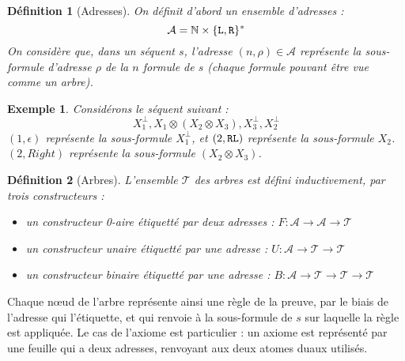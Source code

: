 \documentclass[11pt,a4paper]{article}
\newtheorem{example}{Exemple}
\newtheorem{definition}{Définition}
\newcommand*{\orth}{^\perp}
\newcommand*{\tensor}{\otimes}
\newcommand*{\Left}{\textnormal{\texttt{L}}}
\newcommand*{\Right}{\textnormal{\texttt{R}}}
\newcommand*{\trees}{\ensuremath{\mathcal{T}}}
\begin{document}
\begin{definition}[Adresses]
On définit d'abord un ensemble d'adresses :
\begin{equation*}
\mathcal{A} = \mathbb{N} \times \{ \Left, \Right\}^{*}  
\end{equation*}
On considère que, dans un séquent $s$, l'adresse $(n, \rho) \in \mathcal{A}$ représente la sous-formule d'adresse $\rho$ de la $n$\ieme{} formule de $s$ (chaque formule pouvant être vue comme un arbre).
\end{definition}

\begin{example}
Considérons le séquent suivant : 
\begin{equation*}
X_1\orth, X_1 \tensor (X_2 \tensor X_3), X_3\orth, X_2\orth
\end{equation*}
$(1, \epsilon)$ représente la sous-formule $X_1\orth$, et $(2, \Right \Left)$ représente la sous-formule $X_2$. $(2, Right)$ représente la sous-formule $(X_2 \tensor X_3)$.
\end{example}

\begin{definition}[Arbres]
L'ensemble \trees{} des arbres est défini inductivement, par trois constructeurs :
\begin{itemize}
  \item un constructeur 0-aire étiquetté par deux adresses : $F: \mathcal{A} \rightarrow \mathcal{A} \rightarrow \trees$
  \item un constructeur unaire étiquetté par une adresse : $U: \mathcal{A} \rightarrow \trees \rightarrow \trees$
  \item un constructeur binaire étiquetté par une adresse : $B: \mathcal{A} \rightarrow \trees \rightarrow \trees \rightarrow \trees$
\end{itemize}
\end{definition}

Chaque n\oe ud de l'arbre représente ainsi une règle de la preuve, par le biais de l'adresse qui l'étiquette, et qui renvoie à la sous-formule de $s$ sur laquelle la règle est appliquée. Le cas de l'axiome est particulier : un axiome est représenté par une feuille qui a deux adresses, renvoyant aux deux atomes duaux utilisés.
\end{document}
